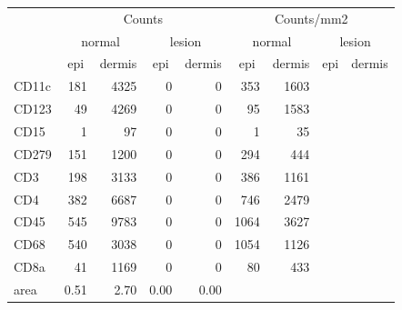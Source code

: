\begin{tabular}{lrrrr|rrrr}
   \hline
 
         \multicolumn{1}{c}{} & \multicolumn{4}{c|}{Counts} & \multicolumn{4}{c}{Counts/mm2} \\ 
         \multicolumn{1}{c}{} & \multicolumn{2}{c}{normal} & \multicolumn{2}{c|}{lesion} & \multicolumn{2}{c}{normal} & \multicolumn{2}{c}{lesion}  \\ 
         \multicolumn{1}{c}{} & \multicolumn{1}{c}{epi} & dermis & \multicolumn{1}{c}{epi} & \multicolumn{1}{c|}{dermis} & \multicolumn{1}{c}{epi} & dermis & \multicolumn{1}{c}{epi} & dermis  \\ 
         \hline
    CD11c & 181 & 4325 & 0 & 0 & 353 & 1603 &  &  \\ 
  CD123 & 49 & 4269 & 0 & 0 & 95 & 1583 &  &  \\ 
  CD15 & 1 & 97 & 0 & 0 & 1 & 35 &  &  \\ 
  CD279 & 151 & 1200 & 0 & 0 & 294 & 444 &  &  \\ 
  CD3 & 198 & 3133 & 0 & 0 & 386 & 1161 &  &  \\ 
  CD4 & 382 & 6687 & 0 & 0 & 746 & 2479 &  &  \\ 
  CD45 & 545 & 9783 & 0 & 0 & 1064 & 3627 &  &  \\ 
  CD68 & 540 & 3038 & 0 & 0 & 1054 & 1126 &  &  \\ 
  CD8a & 41 & 1169 & 0 & 0 & 80 & 433 &  &  \\ 
  area & 0.51 & 2.70 & 0.00 & 0.00 &    &    &    &    \\ 
   \hline
\end{tabular}
